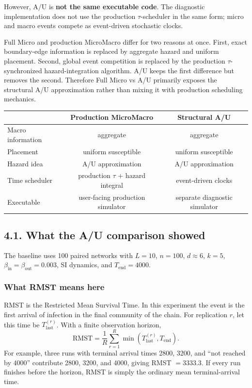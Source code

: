\documentclass[11pt,a4paper]{article}
\begin{document}
However, A/U is \textbf{not the same executable code}. The diagnostic implementation does not use the production $\tau$-scheduler in the same form; micro and macro events compete as event-driven stochastic clocks.

\begin{tcolorbox}[colback=soft,colframe=macro,title=Why A/U is needed]
Full Micro and production MicroMacro differ for two reasons at once. First, exact boundary-edge information is replaced by aggregate hazard and uniform placement. Second, global event competition is replaced by the production $\tau$-synchronized hazard-integration algorithm. A/U keeps the first difference but removes the second. Therefore Full Micro vs A/U primarily exposes the structural A/U approximation rather than mixing it with production scheduling mechanics.
\end{tcolorbox}

\begin{center}
\begin{tabular}{lcc}
\toprule
 & \textbf{Production MicroMacro} & \textbf{Structural A/U}\\
\midrule
Macro information & aggregate & aggregate\\
Placement & uniform susceptible & uniform susceptible\\
Hazard idea & A/U approximation & A/U approximation\\
Time scheduler & production $\tau$ + hazard integral & event-driven clocks\\
Executable & user-facing production simulator & separate diagnostic simulator\\
\bottomrule
\end{tabular}
\end{center}

\subsection*{4.1. What the A/U comparison showed}
The baseline uses 100 paired networks with $L=10$, $n=100$, $d\approx6$, $k=5$, $\beta_{\mathrm{in}}=\beta_{\mathrm{out}}=0.003$, SI dynamics, and $T_{\mathrm{end}}=4000$.

\subsubsection*{What RMST means here}
RMST is the Restricted Mean Survival Time. In this experiment the event is the first arrival of infection in the final community of the chain. For replication $r$, let this time be $T_{\mathrm{last}}^{(r)}$. With a finite observation horizon,
\[
\mathrm{RMST}=\frac{1}{R}\sum_{r=1}^{R}\min\!\left(T_{\mathrm{last}}^{(r)},T_{\mathrm{end}}\right).
\]
For example, three runs with terminal arrival times 2800, 3200, and ``not reached by 4000'' contribute 2800, 3200, and 4000, giving RMST $=3333.3$. If every run finishes before the horizon, RMST is simply the ordinary mean terminal-arrival time.
\end{document}
